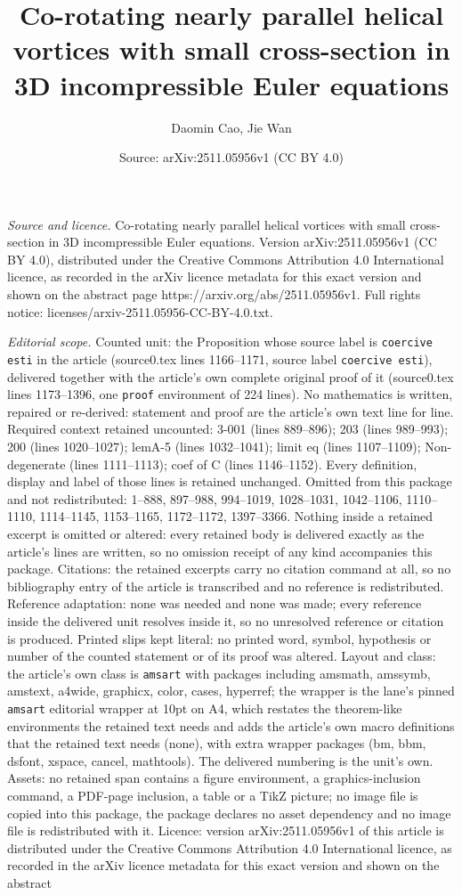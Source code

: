 \documentclass[10pt,a4paper]{amsart}
\title[Co-rotating nearly parallel helical vortices with small cros]{Co-rotating nearly parallel helical vortices with small cross-section in 3D incompressible Euler equations}
\author{Daomin Cao, Jie Wan}
\date{Source: arXiv:2511.05956v1 (CC BY 4.0)}
\begin{document}
\maketitle

\noindent\emph{Source and licence.} Co-rotating nearly parallel helical vortices with small cross-section in 3D incompressible Euler equations. Version arXiv:2511.05956v1 (CC BY 4.0), distributed under the Creative Commons Attribution 4.0 International licence, as recorded in the arXiv licence metadata for this exact version and shown on the abstract page https://arxiv.org/abs/2511.05956v1. Full rights notice: licenses/arxiv-2511.05956-CC-BY-4.0.txt.\par\smallskip

\noindent\textit{Editorial scope.} Counted unit: the Proposition whose source label is \texttt{coercive esti} in the article (source0.tex lines 1166--1171, source label \texttt{coercive esti}), delivered together with the article's own complete original proof of it (source0.tex lines 1173--1396, one \texttt{proof} environment of 224 lines). No mathematics is written, repaired or re-derived: statement and proof are the article's own text line for line. Required context retained uncounted: 3-001 (lines 889--896); 203 (lines 989--993); 200 (lines 1020--1027); lemA-5 (lines 1032--1041); limit eq (lines 1107--1109); Non-degenerate (lines 1111--1113); coef of C (lines 1146--1152). Every definition, display and label of those lines is retained unchanged. Omitted from this package and not redistributed: 1--888, 897--988, 994--1019, 1028--1031, 1042--1106, 1110--1110, 1114--1145, 1153--1165, 1172--1172, 1397--3366. Nothing inside a retained excerpt is omitted or altered: every retained body is delivered exactly as the article's lines are written, so no omission receipt of any kind accompanies this package. Citations: the retained excerpts carry no citation command at all, so no bibliography entry of the article is transcribed and no reference is redistributed. Reference adaptation: none was needed and none was made; every reference inside the delivered unit resolves inside it, so no unresolved reference or citation is produced. Printed slips kept literal: no printed word, symbol, hypothesis or number of the counted statement or of its proof was altered. Layout and class: the article's own class is \texttt{amsart} with packages including amsmath, amssymb, amstext, a4wide, graphicx, color, cases, hyperref; the wrapper is the lane's pinned \texttt{amsart} editorial wrapper at 10pt on A4, which restates the theorem-like environments the retained text needs and adds the article's own macro definitions that the retained text needs (none), with extra wrapper packages (bm, bbm, dsfont, xspace, cancel, mathtools). The delivered numbering is the unit's own. Assets: no retained span contains a figure environment, a graphics-inclusion command, a PDF-page inclusion, a table or a TikZ picture; no image file is copied into this package, the package declares no asset dependency and no image file is redistributed with it. Licence: version arXiv:2511.05956v1 of this article is distributed under the Creative Commons Attribution 4.0 International licence, as recorded in the arXiv licence metadata for this exact version and shown on the abstract 
\end{document}

